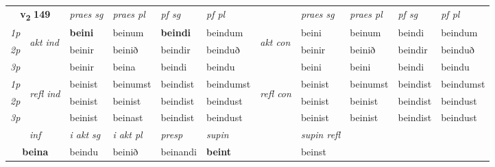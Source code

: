 \noindent
\begin{tabular}{lllllllllll} \toprule
\multicolumn{2}{c}{\textbf{v{\textsubscript{2}}} \Large{\textbf{149}}}  &  \textit{praes sg}  & \textit{praes pl}  &\textit{ pf sg} & \textit{pf pl} &  &  \textit{praes sg}  & \textit{praes pl}  & \textit{pf sg} & \textit{pf pl } \\*
	\cmidrule{3-6} \cmidrule{8-11}
 {\textit{1p}} & \multirow{3}{*}{\begin{turn}{90}\textit{akt ind}\end{turn}} & \textbf{beini} & beinum & \textbf{beindi} & beindum & \multirow{3}{*}{\begin{turn}{90}\textit{akt con}\end{turn}} &beini & beinum & beindi & beindum\\*
 {\textit{2p}} &  &  beinir  & beinið & beindir & beinduð & & beinir & beinið & beindir & beinduð \\*
{\textit{3p}} &  & beinir & beina & beindi & beindu & & beini & beini& beindi & beindu \\*
\cmidrule{3-6} \cmidrule{8-11}
 {\textit{1p}} & \multirow{3}{*}{\begin{turn}{90}\textit{refl ind}\end{turn}}  & beinist & beinumst & beindist & beindumst & \multirow{3}{*}{\begin{turn}{90}\textit{refl con}\end{turn}}  &beinist & beinumst & beindist & beindumst \\*
 {\textit{2p}} &  & beinist & beinist & beindist & beindust & &beinist & beinist & beindist & beindust \\*
 {\textit{3p}}  & & beinist & beinast & beindist & beindust & & beinist & beinist& beindist & beindust \\*
\cmidrule{3-6} \cmidrule{8-11}

   \multicolumn{2}{c}{\textit{inf}}  & \textit{i akt sg} & \textit{i akt pl}   & \textit{presp} & \textit{supin} && \textit{supin refl}  \\*
  \multicolumn{2}{c}{\textbf{beina}} & beindu  & beinið   & beinandi &  \textbf{beint} && beinst  \\*
\end{tabular}


